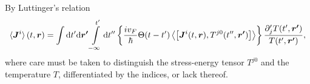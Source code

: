 By Luttinger's relation
\begin{equation}\label{eq:current-luttinger-final}
  \braket{\bm{J}^i}(t, \bm{r}) =
  \int \mathrm{d}t' \mathrm{d} \bm{r'}
  \int\limits_{-\infty }^{t'} \mathrm{d}t''
  \left\{
    \frac{i v_{F}}{\hbar} \Theta(t-t') \Braket{\left[
        \bm{J}^i(t, \bm{r}), T^{j0}(t'', \bm{r'})
      \right]}
  \right\} 
  \frac{
    \partial'_j T (t', \bm{r'})}{
    T(t', \bm{r'})
  },
\end{equation}
where care must be taken to distinguish the stress-energy tensor $T^{j0}$ and the temperature $T$, differentiated by the indices, or lack thereof.



